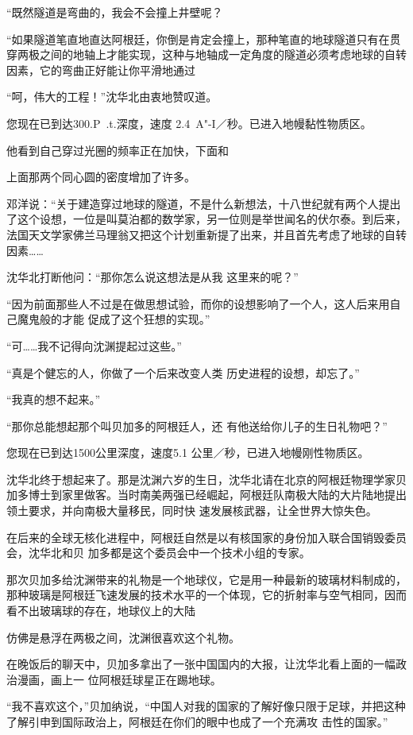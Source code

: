 \documentclass{article}
\begin{document}
“既然隧道是弯曲的，我会不会撞上井壁呢？

“如果隧道笔直地直达阿根廷，你倒是肯定会撞上，那种笔直的地球隧道只有在贯穿两极之间的地轴上才能实现，这种与地轴成一定角度的隧道必须考虑地球的自转因素，它的弯曲正好能让你平滑地通过

“呵，伟大的工程！”沈华北由衷地赞叹道。

您现在已到达300.P~.t.深度，速度
2.4~A"-I／秒。已进入地幔黏性物质区。 

他看到自己穿过光圈的频率正在加快，下面和
\newpage

上面那两个同心圆的密度增加了许多。 

邓洋说：“关于建造穿过地球的隧道，不是什么新想法，十八世纪就有两个人提出了这个设想，一位是叫莫泊都的数学家，另一位则是举世闻名的伏尔泰。到后来，法国天文学家佛兰马理翁又把这个计划重新提了出来，并且首先考虑了地球的自转因素……

沈华北打断他问：“那你怎么说这想法是从我
这里来的呢？” 

“因为前面那些人不过是在做思想试验，而你的设想影响了一个人，这人后来用自己魔鬼般的才能
促成了这个狂想的实现。” 


“可……我不记得向沈渊提起过这些。” 

“真是个健忘的人，你做了一个后来改变人类
历史进程的设想，却忘了。” 


\newpage

“我真的想不起来。” 

“那你总能想起那个叫贝加多的阿根廷人，还
有他送给你儿子的生日礼物吧？” 

您现在已到达1500公里深度，速度5.1
公里／秒，已进入地幔刚性物质区。 

沈华北终于想起来了。那是沈渊六岁的生日，沈华北请在北京的阿根廷物理学家贝加多博士到家里做客。当时南美两强已经崛起，阿根廷队南极大陆的大片陆地提出领土要求，并向南极大量移民，同时快
速发展核武器，让全世界大惊失色。 

在后来的全球无核化进程中，阿根廷自然是以有核国家的身份加入联合国销毁委员会，沈华北和贝
加多都是这个委员会中一个技术小组的专家。 

那次贝加多给沈渊带来的礼物是一个地球仪，它是用一种最新的玻璃材料制成的，那种玻璃是阿根廷飞速发展的技术水平的一个体现，它的折射率与空气相同，因而看不出玻璃球的存在，地球仪上的大陆
\newpage

仿佛是悬浮在两极之间，沈渊很喜欢这个礼物。 

在晚饭后的聊天中，贝加多拿出了一张中国国内的大报，让沈华北看上面的一幅政治漫画，画上一
位阿根廷球星正在踢地球。 

“我不喜欢这个，”贝加纳说，“中国人对我的国家的了解好像只限于足球，并把这种了解引申到国际政治上，阿根廷在你们的眼中也成了一个充满攻
击性的国家。” 
\end{document}
